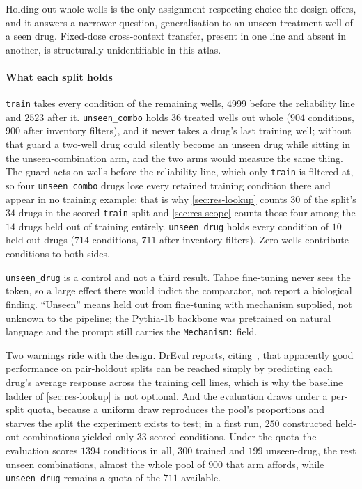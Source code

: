 Holding out whole wells is the only assignment-respecting choice the design
offers, and it answers a narrower question, generalisation to an unseen treatment
well of a seen drug. Fixed-dose cross-context transfer, present in one line and
absent in another, is structurally unidentifiable in this atlas.

\paragraph{What each split holds} \texttt{train} takes every condition of the
remaining wells, $\num{4999}$ before the reliability line and $\num{2523}$
after it.
\texttt{unseen\_combo} holds $\num{36}$ treated wells out whole ($\num{904}$
conditions, $\num{900}$ after inventory filters), and it never takes a drug's
last training well; without that guard a two-well drug could silently become an unseen drug while sitting in the unseen-combination arm, and the two arms would measure the same thing. The guard acts on wells before the reliability line, which only \texttt{train} is filtered at, so four \texttt{unseen\_combo} drugs lose every retained training condition there and appear in no training example; that is why \cref{sec:res-lookup} counts $30$ of the split's $34$ drugs in the scored \texttt{train} split and \cref{sec:res-scope} counts those four among the $14$ drugs held out of training entirely. \texttt{unseen\_drug} holds every condition of
$\num{10}$ held-out drugs ($\num{714}$ conditions, $\num{711}$ after inventory
filters). Zero wells contribute conditions to both sides.

\texttt{unseen\_drug} is a control and not a third result. Tahoe fine-tuning
never sees the token, so a large effect there would indict the comparator, not
report a biological finding. ``Unseen'' means held out from fine-tuning with
mechanism supplied, not unknown to the pipeline; the Pythia-1b backbone was
pretrained on natural language and the prompt still carries the
\texttt{Mechanism:} field.

Two warnings ride with the design. DrEval reports, citing~\cite{partin}, that
apparently good performance on pair-holdout splits can be reached simply by
predicting each drug's average response across the training cell lines, which is
why the baseline ladder of \cref{sec:res-lookup} is not optional. And the
evaluation draws under a per-split quota, because a uniform draw reproduces the
pool's proportions and starves the split the experiment exists to test; in a
first run,
$\num{250}$ constructed held-out combinations yielded only $\num{33}$ scored
conditions. Under the quota the evaluation scores $\num{1394}$ conditions in all,
$\num{300}$ trained and $\num{199}$ unseen-drug, the rest unseen combinations,
almost the whole pool of $\num{900}$ that arm affords, while
\texttt{unseen\_drug} remains a quota of the $\num{711}$ available.

